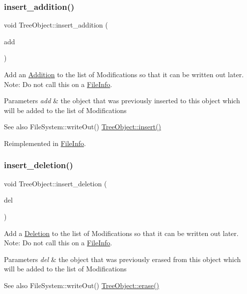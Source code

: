 \subsubsection{\texorpdfstring{insert\+\_\+addition()}{insert\_addition()}}
{\footnotesize\ttfamily void Tree\+Object\+::insert\+\_\+addition (\begin{DoxyParamCaption}\item[{\mbox{\hyperlink{classTreeObject}{Tree\+Object}} $\ast$}]{add }\end{DoxyParamCaption})\hspace{0.3cm}{\ttfamily [virtual]}}

Add an \mbox{\hyperlink{classAddition}{Addition}} to the list of Modifications so that it can be written out later. Note\+: Do not call this on a \mbox{\hyperlink{classFileInfo}{File\+Info}}. 
\begin{DoxyParams}{Parameters}
{\em add} & the object that was previously inserted to this object which will be added to the list of Modifications \\
\hline
\end{DoxyParams}
\begin{DoxySeeAlso}{See also}
File\+System\+::write\+Out() \mbox{\hyperlink{classTreeObject_af8cc57edba9f435b52ccf33cfbbb2fc6}{Tree\+Object\+::insert()}} 
\end{DoxySeeAlso}


Reimplemented in \mbox{\hyperlink{classFileInfo_a7f788f31521c535646eebfa9959bbb24}{File\+Info}}.

\mbox{\label{classTreeObject_afcc4b3928d2b77ff080aa229a9706215}} 
\subsubsection{\texorpdfstring{insert\+\_\+deletion()}{insert\_deletion()}}
{\footnotesize\ttfamily void Tree\+Object\+::insert\+\_\+deletion (\begin{DoxyParamCaption}\item[{\mbox{\hyperlink{classTreeObject}{Tree\+Object}} $\ast$}]{del }\end{DoxyParamCaption})\hspace{0.3cm}{\ttfamily [virtual]}}

Add a \mbox{\hyperlink{classDeletion}{Deletion}} to the list of Modifications so that it can be written out later. Note\+: Do not call this on a \mbox{\hyperlink{classFileInfo}{File\+Info}}. 
\begin{DoxyParams}{Parameters}
{\em del} & the object that was previously erased from this object which will be added to the list of Modifications \\
\hline
\end{DoxyParams}
\begin{DoxySeeAlso}{See also}
File\+System\+::write\+Out() \mbox{\hyperlink{classTreeObject_a453b5df2a9ef7c6faad259900d574ee2}{Tree\+Object\+::erase()}} 
\end{DoxySeeAlso}



